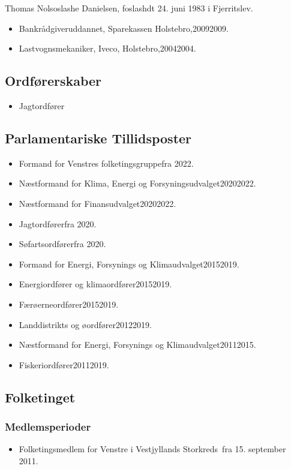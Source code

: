 \documentclass[11pt, a4paper]{awesome-cv}
\begin{document}
\makecvheader[R]
\makelettertitle
\begin{cvletter}
Thomas Nolsoslashe Danielsen, foslashdt 24. juni 1983 i Fjerritslev.

\begin{itemize}
\item Bankrådgiveruddannet, Sparekassen Holstebro,20092009.
\item Lastvognsmekaniker, Iveco, Holstebro,20042004.
\end{itemize}
\subsection*{Ordførerskaber}
\begin{itemize}
\item Jagtordfører
\end{itemize}
\subsection*{Parlamentariske Tillidsposter}
\begin{itemize}
\item Formand for Venstres folketingsgruppefra 2022.
\item Næstformand for Klima, Energi og Forsyningsudvalget20202022.
\item Næstformand for Finansudvalget20202022.
\item Jagtordførerfra 2020.
\item Søfartsordførerfra 2020.
\item Formand for Energi, Forsynings og Klimaudvalget20152019.
\item Energiordfører og klimaordfører20152019.
\item Færøerneordfører20152019.
\item Landdistrikts og øordfører20122019.
\item Næstformand for Energi, Forsynings og Klimaudvalget20112015.
\item Fiskeriordfører20112019.
\end{itemize}
\subsection*{Folketinget}
\subsubsection*{Medlemsperioder}
\begin{itemize}
\item Folketingsmedlem for Venstre i Vestjyllands Storkreds fra 15. september 2011.
\end{itemize}

\end{cvletter}
\end{document}
